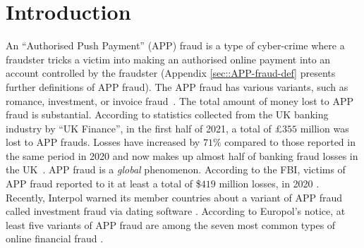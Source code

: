 
\vspace{-3mm}
\section{Introduction}\label{sec::intro}
\vspace{-2mm}

An  ``Authorised Push Payment'' (APP) fraud is a type of cyber-crime where a fraudster tricks a victim into making an authorised online payment into an account controlled by the fraudster (Appendix \ref{sec::APP-fraud-def} presents further definitions of APP fraud).  The APP fraud has various variants, such as romance, investment, or invoice fraud~\cite{overview-of-payment-fraud}. The total amount of money lost to  APP fraud is substantial. According to
statistics collected from the UK banking industry by ``UK Finance'',  in the first half of 2021, a total of £$355$ million was lost to APP frauds. Losses have increased by  $71\%$  compared to those reported in the same period in 2020 and now makes up almost half of banking fraud losses in the UK~\cite{2021-Half-Year-Fraud-Update}. 
APP fraud is a \emph{global} phenomenon. According to the FBI, victims of APP fraud reported to it at least a total of  \$$419$ million losses, in 2020 \cite{internet-crime-report}. Recently, Interpol warned its member countries about a    variant of APP fraud called investment fraud via dating software \cite{interpol-notce}. According to  Europol’s notice, at least five variants of APP fraud are among the seven most common types of online financial fraud \cite{europol-notice}. 



